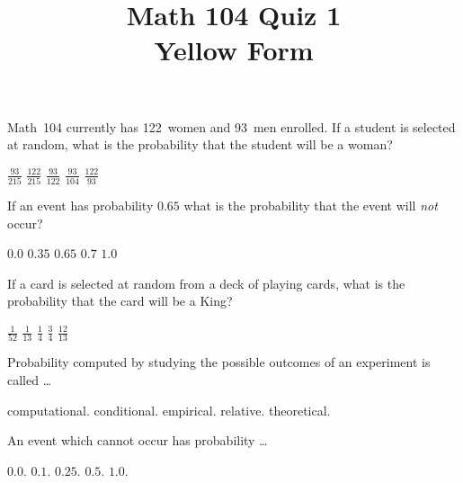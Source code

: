 \documentclass[answers,12pt]{exam}
\title{Math 104 Quiz 1\\Yellow Form}
\begin{document}
\maketitle
\begin{center}
\end{center}

\begin{questions}
\question Math~104 currently has 122~women and 93~men enrolled.
If a student is selected at random, what is the probability
that the student will be a woman?\\
\begin{oneparchoices}
\choice $\frac{93}{215}$
\choice $\frac{122}{215}$
\choice $\frac{93}{122}$
\choice $\frac{93}{104}$
\choice $\frac{122}{93}$
\end{oneparchoices}

\question If an event has probability $0.65$
what is the probability that the event will {\em not} occur?\\
\begin{oneparchoices}
\choice $0.0$
\choice $0.35$
\choice $0.65$
\choice $0.7$
\choice $1.0$
\end{oneparchoices}

\question If a card is selected at random from a deck of
playing cards, what is the probability that
the card will be a King?\\
\begin{oneparchoices}
\choice $\frac{1}{52}$
\choice $\frac{1}{13}$
\choice $\frac{1}{4}$
\choice $\frac{3}{4}$
\choice $\frac{12}{13}$
\end{oneparchoices}

\question Probability computed by studying
the possible outcomes of an experiment is called \dots\\
\begin{oneparchoices}
\choice computational.
\choice conditional.
\choice empirical.
\choice relative.
\choice theoretical.
\end{oneparchoices}

\question An event which cannot occur has probability \dots\\
\begin{oneparchoices}
\choice $0.0$.
\choice $0.1$.
\choice $0.25$.
\choice $0.5$.
\choice $1.0$.
\end{oneparchoices}


\end{questions}
\end{document}
